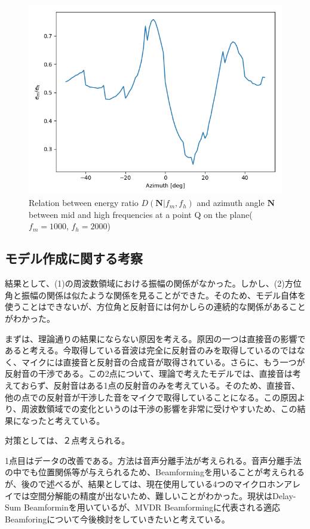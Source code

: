 \begin{figure}[ht]　　
  \begin{center}
  \vspace{1zh}
    \includegraphics[width=0.5\linewidth]{images/3_d_n_heimen.png}   
  \end{center}
  \caption{Relation between energy ratio $D(\mathbf{N}|f_m, f_h)$ and azimuth angle $\mathbf{N}$ between mid and high frequencies at a point Q on the plane($f_m = 1000$, $f_h = 2000$)}
  \label{fig:result3}
\end{figure}

\clearpage

\subsection{モデル作成に関する考察}
\label{sec:model_dissucussion}
 結果として、(1)の周波数領域における振幅の関係がなかった。しかし、(2)方位角と振幅の関係は似たような関係を見ることができた。そのため、モデル自体を使うことはできないが、方位角と反射音には何かしらの連続的な関係があることがわかった。
 
 まずは、理論通りの結果にならない原因を考える。原因の一つは直接音の影響であると考える。今取得している音波は完全に反射音のみを取得しているのではなく、マイクには直接音と反射音の合成音が取得されている。さらに、もう一つが反射音の干渉である。この2点について、理論で考えたモデルでは、直接音は考えておらず、反射音はある1点の反射音のみを考えている。そのため、直接音、他の点での反射音が干渉した音をマイクで取得していることになる。この原因より、周波数領域での変化というのは干渉の影響を非常に受けやすいため、この結果になったと考えている。
 
 対策としては、２点考えられる。
 
 1点目はデータの改善である。方法は音声分離手法が考えられる。音声分離手法の中でも位置関係等が与えられるため、Beamformingを用いることが考えられるが、後ので述べるが、結果としては、現在使用している4つのマイクロホンアレイでは空間分解能の精度が出ないため、難しいことがわかった。現状はDelay-Sum Beamforminを用いているが、MVDR Beamformingに代表される適応Beamforingについて今後検討をしていきたいと考えている。
 

